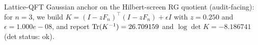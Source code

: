 \noindent Lattice-QFT Gaussian anchor on the Hilbert-screen RG quotient (audit-facing): for $n=3$, we build $K=(I-zF_n)^\top(I-zF_n)+\epsilon I$ with $z=0.250$ and $\epsilon=1.000e-08$, and report $\mathrm{Tr}(K^{-1})=26.709159$ and $\log\det K=-8.186741$ (det status: ok).